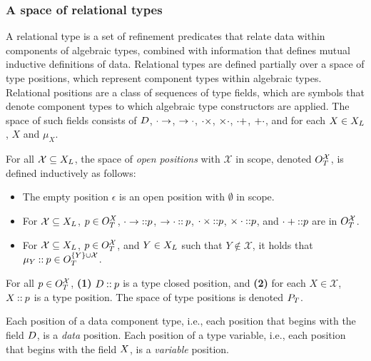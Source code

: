 \subsubsection{A space of relational types}
\label{sec:rel-type-space}
A relational type is a set of refinement predicates that relate data
within components of algebraic types, combined with information that
defines mutual inductive definitions of data.
%
Relational types are defined partially over a space of type positions,
which represent component types within algebraic types.
%
Relational positions are a class of sequences of type fields, which
are symbols that denote component types to which algebraic type
constructors are applied.
%
The space of such fields consists of $D$, $\cdot \to$,
$\to \cdot$, $\cdot \times$, $\times \cdot$, $\cdot +$,
$+ \cdot$, and for each $X \in X_L$, $X$ and $\mu_X$.
%
\begin{defn}
  \label{defn:ty-pos}
  For all $\mathcal{X} \subseteq X_L$, the space of \emph{open
    positions} with $\mathcal{X}$ in scope, denoted
  $O_T^{ \mathcal{X} }$, is defined inductively as follows:
  \begin{itemize}
  \item
    The empty position $\epsilon$ is an open position with $\emptyset$
    in scope.
  \item
    For $\mathcal{X} \subseteq X_L$, $p \in O_T^{X}$,
    $\cdot \to \mathbin{::} p$, $\to \cdot \mathbin{::} p$,
    $\cdot \times \mathbin{::} p$, $\times \cdot \mathbin{::} p$, and
    $\cdot + \mathbin{::} p$ are in $O_T^{ \mathcal{X} }$.
  \item
    For $\mathcal{X} \subseteq X_L$,
    $p \in O_T^{ \mathcal{X} }$, and $Y \in X_L$ such that
    $Y \notin \mathcal{X}$, it holds that
    $\mu_Y \mathbin{::} p \in O_T^{ \{  Y  \} \cup  \mathcal{X}  }$.
  \end{itemize}
  For all $p \in O_T^{ \mathcal{X} }$, \textbf{(1)}
  $D \mathbin{::} p$ is a type closed position, and \textbf{(2)}
  for each $X \in \mathcal{X}$, $X \mathbin{::} p$ is a type position.
  The space of type positions is denoted $P_T$.
\end{defn}
Each position of a data component type, i.e., each position that begins
with the field $D$, is a \emph{data} position.
%
Each position of a type variable, i.e., each position that begins with
the field $X$, is a \emph{variable} position.

